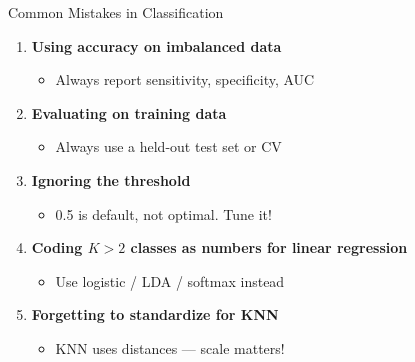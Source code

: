 \documentclass[aspectratio=169, 11pt]{beamer}
\begin{document}
\begin{frame}{Common Mistakes in Classification}

\begin{enumerate}
  \item \textbf{Using accuracy on imbalanced data}
  \begin{itemize}
    \item[$\circ$] Always report sensitivity, specificity, AUC
  \end{itemize}

  \vspace{0.3em}
  \item \textbf{Evaluating on training data}
  \begin{itemize}
    \item[$\circ$] Always use a held-out test set or CV
  \end{itemize}

  \vspace{0.3em}
  \item \textbf{Ignoring the threshold}
  \begin{itemize}
    \item[$\circ$] 0.5 is default, not optimal. Tune it!
  \end{itemize}

  \vspace{0.3em}
  \item \textbf{Coding $K > 2$ classes as numbers for linear regression}
  \begin{itemize}
    \item[$\circ$] Use logistic / LDA / softmax instead
  \end{itemize}

  \vspace{0.3em}
  \item \textbf{Forgetting to standardize for KNN}
  \begin{itemize}
    \item[$\circ$] KNN uses distances --- scale matters!
  \end{itemize}
\end{enumerate}
\end{frame}
\end{document}
